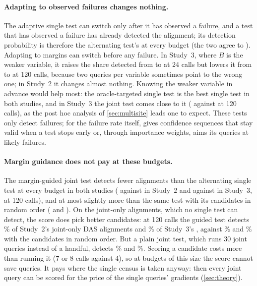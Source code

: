\paragraph{Adapting to observed failures changes nothing.}
The adaptive single test can switch only after it has observed a failure, and a test that has observed a failure has
already detected the alignment; its detection probability is therefore the alternating test's at every budget (the
two agree to \StAdaptiveDiff). Adapting to margins can switch before any failure. In Study~3, where $B$ is the weaker
variable, it raises the share detected from \StThreeAltTwentyFour{} to \StThreeAdaptMarginTwentyFour{} at 24 calls
but lowers it from \StThreeAltOneTwenty{} to \StThreeAdaptMarginOneTwenty{} at 120 calls, because two queries per
variable sometimes point to the wrong one; in Study~2 it changes almost nothing. Knowing the weaker variable in advance would help most:
the oracle-targeted single test is the best single test in both studies, and in Study~3 the joint test comes close to
it (\StThreeJointOneTwenty{} against \StThreeOracleOneTwenty{} at 120 calls), as the post hoc analysis of
\cref{sec:multisite} leads one to expect. These tests only detect failures; for the failure rate
itself, \citet{asiaee2026certified} gives confidence sequences that stay valid when a test stops early or, through
importance weights, aims its queries at likely failures.

\paragraph{Margin guidance does not pay at these budgets.}
The margin-guided joint test detects fewer alignments than the alternating single test at every budget in both
studies (\StTwoGuidedOneTwenty{} against \StTwoAltOneTwenty{} in Study~2 and \StThreeGuidedOneTwenty{} against
\StThreeAltOneTwenty{} in Study~3, at 120 calls), and at most slightly more than the same test with its candidates
in random order (\StTwoGuidedRandomOneTwenty{} and \StThreeGuidedRandomOneTwenty). On the joint-only alignments, which no
single test can detect, the score does pick better candidates: at 120 calls the guided test detects
\StTwoJoGuidedOneTwenty\% of Study~2's \StTwoJoCount{} joint-only DAS alignments and \StThreeJoGuidedOneTwenty\% of
Study~3's \StThreeJoCount, against \StTwoJoGuidedRandomOneTwenty\% and \StThreeJoGuidedRandomOneTwenty\% with the
candidates in random order. But a plain joint test, which runs 30 joint queries instead of a handful, detects \StTwoJoJointOneTwenty\% and
\StThreeJoJointOneTwenty\%. Scoring a candidate costs more than running it (7 or 8 calls against 4), so at budgets of
this size the score cannot save queries. It pays where the single census is taken anyway: then every joint query can
be scored for the price of the single queries' gradients (\cref{sec:theory}).
